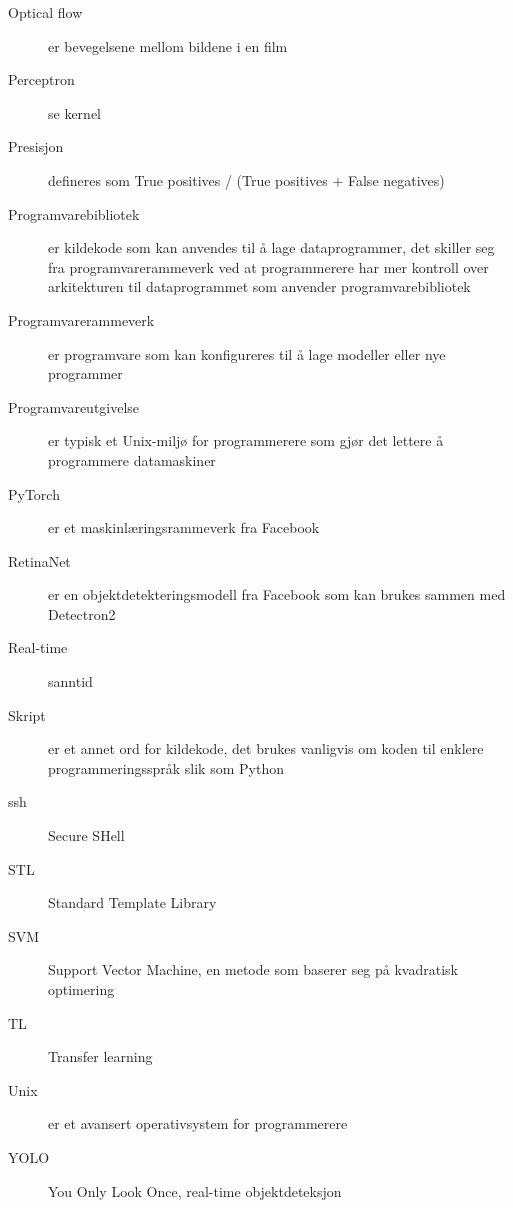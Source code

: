 \begin{description}
\item[Optical flow] er bevegelsene mellom bildene i en film
\item[Perceptron] se kernel
\item[Presisjon] defineres som True positives / (True positives + False negatives)
\item[Programvarebibliotek] er kildekode som kan anvendes til å lage dataprogrammer, det skiller seg fra programvarerammeverk ved at programmerere har mer kontroll over arkitekturen til dataprogrammet som anvender programvarebibliotek
\item[Programvarerammeverk] er programvare som kan konfigureres til å lage modeller eller nye programmer
\item[Programvareutgivelse] er typisk et Unix-miljø for programmerere som gjør det lettere å programmere datamaskiner
\item[PyTorch] er et maskinlæringsrammeverk fra Facebook
\item[RetinaNet] er en objektdetekteringsmodell fra Facebook som kan brukes sammen med Detectron2
\item[Real-time] sanntid
\item[Skript] er et annet ord for kildekode, det brukes vanligvis om koden til enklere programmeringsspråk slik som Python
\item[ssh] Secure SHell
\item[STL] Standard Template Library
\item[SVM] Support Vector Machine, en metode som baserer seg på kvadratisk optimering
\item[TL] Transfer learning
\item[Unix] er et avansert operativsystem for programmerere
\item[YOLO] You Only Look Once, real-time objektdeteksjon


\end{description}